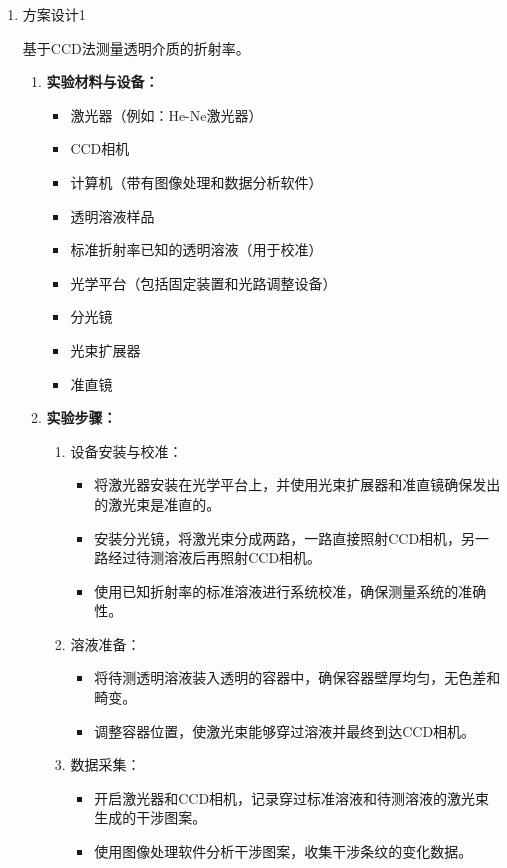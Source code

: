 \documentclass[dvipsnames, svgnames,a4paper,11pt]{article}
\begin{document}
\begin{enumerate}
		\item 方案设计1
		
		基于CCD法测量透明介质的折射率。
		
		\begin{enumerate}
			\item \textbf{实验材料与设备：}
			
			\begin{itemize}
				\item 激光器（例如：He-Ne激光器）
				\item CCD相机
				\item 计算机（带有图像处理和数据分析软件）
				\item 透明溶液样品
				\item 标准折射率已知的透明溶液（用于校准）
				\item 光学平台（包括固定装置和光路调整设备）
				\item 分光镜
				\item 光束扩展器
				\item 准直镜
			\end{itemize}
			
			\item \textbf{实验步骤：}
			
			\begin{enumerate}
				\item 设备安装与校准：
				\begin{itemize}
					\item 将激光器安装在光学平台上，并使用光束扩展器和准直镜确保发出的激光束是准直的。
					\item 安装分光镜，将激光束分成两路，一路直接照射CCD相机，另一路经过待测溶液后再照射CCD相机。
					\item 使用已知折射率的标准溶液进行系统校准，确保测量系统的准确性。
				\end{itemize}
				
				\item 溶液准备：
				\begin{itemize}
					\item 将待测透明溶液装入透明的容器中，确保容器壁厚均匀，无色差和畸变。
					\item 调整容器位置，使激光束能够穿过溶液并最终到达CCD相机。
				\end{itemize}
				
				\item 数据采集：
				\begin{itemize}
					\item 开启激光器和CCD相机，记录穿过标准溶液和待测溶液的激光束生成的干涉图案。
					\item 使用图像处理软件分析干涉图案，收集干涉条纹的变化数据。
				\end{itemize}
				

\end{enumerate}
\end{enumerate}
\end{enumerate}
\end{document}

